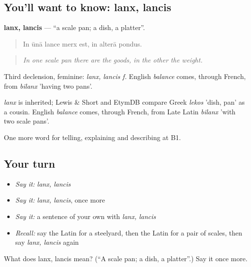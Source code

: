 \subsection*{You'll want to know: lanx, lancis}
\textbf{lanx, lancis} — \textquotedblleft{}a scale pan; a dish, a platter\textquotedblright{}.

\begin{quote}
In ūnā lance merx est, in alterā pondus.
\end{quote}

\begin{quote}
\emph{In one scale pan there are the goods, in the other the weight.}
\end{quote}

Third declension, feminine: \emph{lanx, lancis f.} English \emph{balance} comes, through French, from \emph{bilanx} 'having two pans'.

\begin{cousinweb}
\emph{lanx} is inherited; Lewis \& Short and EtymDB compare Greek \emph{lekos} 'dish, pan' as a cousin. English \emph{balance} comes, through French, from Late Latin \emph{bilanx} 'with two scale pans'.
\end{cousinweb}

\begin{grammarlens}[title={What you've built}]
One more word for telling, explaining and describing at B1.
\end{grammarlens}

\subsection*{Your turn}
\begin{itemize}
\raggedright
  \item \emph{Say it:} \emph{lanx, lancis}
  \item \emph{Say it:} \emph{lanx, lancis}, once more
  \item \emph{Say it:} a sentence of your own with \emph{lanx, lancis}
  \item \emph{Recall:} say the Latin for a steelyard, then the Latin for a pair of scales, then say \emph{lanx, lancis} again
\end{itemize}

\begin{tcolorbox}[breakable,colback=teal!4,colframe=teal!35!black,title={Before you move on}]
What does lanx, lancis mean? (\textquotedblleft{}A scale pan; a dish, a platter\textquotedblright{}.) Say it once more.
\end{tcolorbox}
